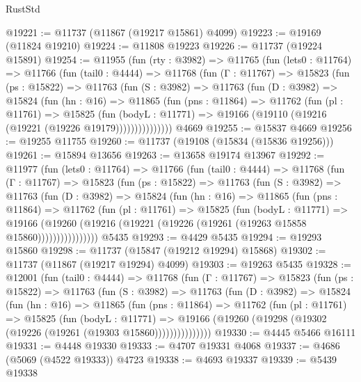 \begin{lexlean}{RustStd}
\begin{coremodule}
@19221 := @11737 (@11867 (@19217 @15861) @4099)
@19223 := @19169 (@11824 @19210)
@19224 := @11808 @19223
@19226 := @11737 (@19224 @15891)
@19254 := @11955
    (fun (rty : @3982) =>
    @11765
      (fun (lets0 : @11764) =>
      @11766
        (fun (tail0 : @4444) =>
        @11768
          (fun (Γ : @11767) =>
          @15823
            (fun (ps : @15822) =>
            @11763
              (fun (S : @3982) =>
              @11763
                (fun (D : @3982) =>
                @15824
                  (fun (hn : @16) =>
                  @11865
                    (fun (pns : @11864) =>
                    @11762
                      (fun (pl : @11761) =>
                      @15825
                        (fun (bodyL : @11771) =>
                        @19166 (@19110 (@19216 (@19221 (@19226 @19179)))))))))))))))
    @4669
@19255 := @15837 @4669
@19256 := @19255 @11755
@19260 := @11737 (@19108 (@15834 (@15836 @19256)))
@19261 := @15894 @13656
@19263 := @13658 @19174 @13967
@19292 := @11977
    (fun (lets0 : @11764) =>
    @11766
      (fun (tail0 : @4444) =>
      @11768
        (fun (Γ : @11767) =>
        @15823
          (fun (ps : @15822) =>
          @11763
            (fun (S : @3982) =>
            @11763
              (fun (D : @3982) =>
              @15824
                (fun (hn : @16) =>
                @11865
                  (fun (pns : @11864) =>
                  @11762
                    (fun (pl : @11761) =>
                    @15825
                      (fun (bodyL : @11771) =>
                      @19166
                        (@19260
                          (@19216 (@19221 (@19226 (@19261 (@19263 @15858 @15860))))))))))))))))
    @5435
@19293 := @4429 @5435
@19294 := @19293 @15860
@19298 := @11737 (@15847 (@19212 @19294) @15868)
@19302 := @11737 (@11867 (@19217 @19294) @4099)
@19303 := @19263 @5435
@19328 := @12001
    (fun (tail0 : @4444) =>
    @11768
      (fun (Γ : @11767) =>
      @15823
        (fun (ps : @15822) =>
        @11763
          (fun (S : @3982) =>
          @11763
            (fun (D : @3982) =>
            @15824
              (fun (hn : @16) =>
              @11865
                (fun (pns : @11864) =>
                @11762
                  (fun (pl : @11761) =>
                  @15825
                    (fun (bodyL : @11771) =>
                    @19166 (@19260 (@19298 (@19302 (@19226 (@19261 (@19303 @15860)))))))))))))))
@19330 := @4445 @5466 @16111
@19331 := @4448 @19330
@19333 := @4707 @19331 @4068
@19337 := @4686 (@5069 (@4522 @19333)) @4723
@19338 := @4693 @19337
@19339 := @5439 @19338

\end{coremodule}
\end{lexlean}

